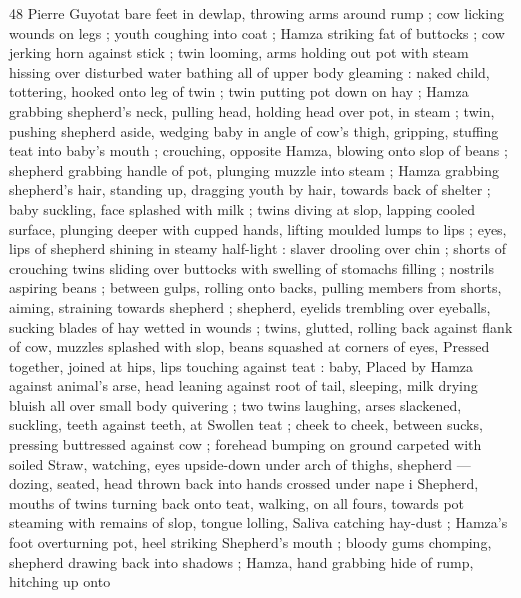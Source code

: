48 Pierre Guyotat
bare feet in dewlap, throwing arms around rump ; cow licking wounds
on legs ; youth coughing into coat ; Hamza striking fat of buttocks ;
cow jerking horn against stick ; twin looming, arms holding out pot
with steam hissing over disturbed water bathing all of upper body
gleaming : naked child, tottering, hooked onto leg of twin ; twin
putting pot down on hay ; Hamza grabbing shepherd's neck, pulling
head, holding head over pot, in steam ; twin, pushing shepherd
aside, wedging baby in angle of cow's thigh, gripping, stuffing teat
into baby’s mouth ; crouching, opposite Hamza, blowing onto slop of
beans ; shepherd grabbing handle of pot, plunging muzzle into
steam ; Hamza grabbing shepherd's hair, standing up, dragging
youth by hair, towards back of shelter ; baby suckling, face splashed
with milk ; twins diving at slop, lapping cooled surface, plunging
deeper with cupped hands, lifting moulded lumps to lips ; eyes, lips
of shepherd shining in steamy half-light : slaver drooling over chin ;
shorts of crouching twins sliding over buttocks with swelling of
stomachs filling ; nostrils aspiring beans ; between gulps, rolling onto
backs, pulling members from shorts, aiming, straining towards
shepherd ; shepherd, eyelids trembling over eyeballs, sucking blades
of hay wetted in wounds ; twins, glutted, rolling back against flank of
cow, muzzles splashed with slop, beans squashed at corners of eyes,
Pressed together, joined at hips, lips touching against teat : baby,
Placed by Hamza against animal's arse, head leaning against root of
tail, sleeping, milk drying bluish all over small body quivering ; two
twins laughing, arses slackened, suckling, teeth against teeth, at
Swollen teat ; cheek to cheek, between sucks, pressing buttressed
against cow ; forehead bumping on ground carpeted with soiled
Straw, watching, eyes upside-down under arch of thighs, shepherd
— dozing, seated, head thrown back into hands crossed under nape
i Shepherd, mouths of twins turning back onto teat, walking, on all
fours, towards pot steaming with remains of slop, tongue lolling,
Saliva catching hay-dust ; Hamza's foot overturning pot, heel striking
Shepherd's mouth ; bloody gums chomping, shepherd drawing back
into shadows ; Hamza, hand grabbing hide of rump, hitching up onto

